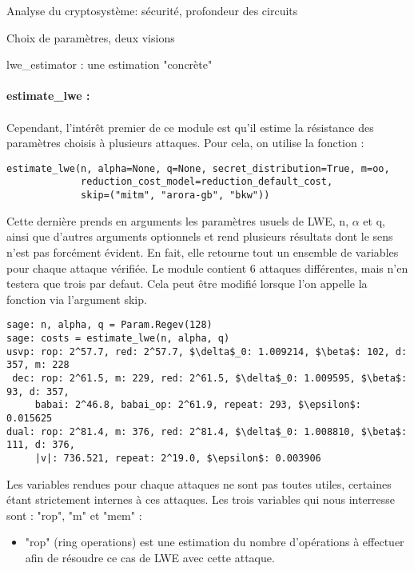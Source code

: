 \begin{section}{Analyse du cryptosystème: sécurité, profondeur des circuits}
\begin{subsection}{Choix de paramètres, deux visions}
\begin{subsubsection}{lwe\_estimator : une estimation "concrète"}
	
	\paragraph{}
	\textbf{estimate\_lwe :}

	\paragraph{}
	Cependant, l'intérêt premier de ce module est qu'il estime la résistance des paramètres choisis à
	plusieurs attaques. Pour cela, on utilise la fonction  :
	
	\flushleft
	
	\begin{lstlisting}
estimate_lwe(n, alpha=None, q=None, secret_distribution=True, m=oo,
             reduction_cost_model=reduction_default_cost,
             skip=("mitm", "arora-gb", "bkw"))
        \end{lstlisting}
	
	\flushleft
	
	Cette dernière prends en arguments les paramètres usuels de LWE, n, $\alpha$ et q, ainsi que
	d'autres arguments optionnels et rend plusieurs résultats dont le sens n'est pas forcément évident.
	En fait, elle retourne tout un ensemble de variables pour chaque attaque vérifiée. Le module
	contient 6 attaques différentes, mais n'en testera que trois par defaut. Cela peut être modifié
	lorsque l'on appelle la fonction  via l'argument skip.
	
	\flushleft
	
	\begin{lstlisting}[mathescape=true]
sage: n, alpha, q = Param.Regev(128)
sage: costs = estimate_lwe(n, alpha, q)
usvp: rop: 2^57.7, red: 2^57.7, $\delta$_0: 1.009214, $\beta$: 102, d: 357, m: 228
 dec: rop: 2^61.5, m: 229, red: 2^61.5, $\delta$_0: 1.009595, $\beta$: 93, d: 357,
     babai: 2^46.8, babai_op: 2^61.9, repeat: 293, $\epsilon$: 0.015625
dual: rop: 2^81.4, m: 376, red: 2^81.4, $\delta$_0: 1.008810, $\beta$: 111, d: 376,
     |v|: 736.521, repeat: 2^19.0, $\epsilon$: 0.003906
	\end{lstlisting}

	\flushleft
	
	Les variables rendues pour chaque attaques ne sont pas toutes utiles, certaines étant strictement
	internes à ces attaques. Les trois variables qui nous interresse sont : "rop", "m" et "mem" :
	
	\begin{itemize}
	\item "rop" (ring operations) est une estimation du nombre d'opérations à effectuer afin de résoudre
	ce cas de LWE avec cette attaque.
	

\end{itemize}
\end{subsubsection}
\end{subsection}
\end{section}
